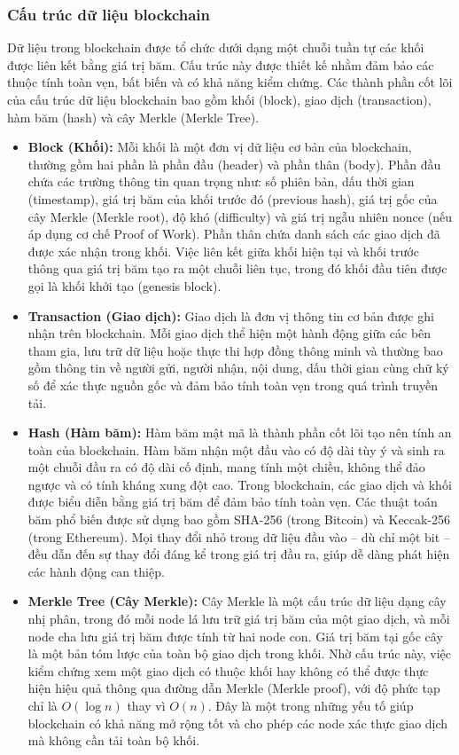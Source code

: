 \subsubsection{Cấu trúc dữ liệu blockchain}

Dữ liệu trong blockchain được tổ chức dưới dạng một chuỗi tuần tự các khối được liên kết bằng giá trị băm. Cấu trúc này được thiết kế nhằm đảm bảo các thuộc tính toàn vẹn, bất biến và có khả năng kiểm chứng. Các thành phần cốt lõi của cấu trúc dữ liệu blockchain bao gồm khối (block), giao dịch (transaction), hàm băm (hash) và cây Merkle (Merkle Tree).

\begin{itemize}
    \item \textbf{Block (Khối):} Mỗi khối là một đơn vị dữ liệu cơ bản của blockchain, thường gồm hai phần là phần đầu (header) và phần thân (body). Phần đầu chứa các trường thông tin quan trọng như: số phiên bản, dấu thời gian (timestamp), giá trị băm của khối trước đó (previous hash), giá trị gốc của cây Merkle (Merkle root), độ khó (difficulty) và giá trị ngẫu nhiên nonce (nếu áp dụng cơ chế Proof of Work). Phần thân chứa danh sách các giao dịch đã được xác nhận trong khối. Việc liên kết giữa khối hiện tại và khối trước thông qua giá trị băm tạo ra một chuỗi liên tục, trong đó khối đầu tiên được gọi là khối khởi tạo (genesis block).

    \item \textbf{Transaction (Giao dịch):} Giao dịch là đơn vị thông tin cơ bản được ghi nhận trên blockchain. Mỗi giao dịch thể hiện một hành động giữa các bên tham gia, lưu trữ dữ liệu hoặc thực thi hợp đồng thông minh và thường bao gồm thông tin về người gửi, người nhận, nội dung, dấu thời gian cùng chữ ký số để xác thực nguồn gốc và đảm bảo tính toàn vẹn trong quá trình truyền tải.

    \item \textbf{Hash (Hàm băm):} Hàm băm mật mã là thành phần cốt lõi tạo nên tính an toàn của blockchain. Hàm băm nhận một đầu vào có độ dài tùy ý và sinh ra một chuỗi đầu ra có độ dài cố định, mang tính một chiều, không thể đảo ngược và có tính kháng xung đột cao. Trong blockchain, các giao dịch và khối được biểu diễn bằng giá trị băm để đảm bảo tính toàn vẹn. Các thuật toán băm phổ biến được sử dụng bao gồm SHA-256 (trong Bitcoin) và Keccak-256 (trong Ethereum). Mọi thay đổi nhỏ trong dữ liệu đầu vào -- dù chỉ một bit -- đều dẫn đến sự thay đổi đáng kể trong giá trị đầu ra, giúp dễ dàng phát hiện các hành động can thiệp.

    \item \textbf{Merkle Tree (Cây Merkle):} Cây Merkle là một cấu trúc dữ liệu dạng cây nhị phân, trong đó mỗi node lá lưu trữ giá trị băm của một giao dịch, và mỗi node cha lưu giá trị băm được tính từ hai node con. Giá trị băm tại gốc cây là một bản tóm lược của toàn bộ giao dịch trong khối. Nhờ cấu trúc này, việc kiểm chứng xem một giao dịch có thuộc khối hay không có thể được thực hiện hiệu quả thông qua đường dẫn Merkle (Merkle proof), với độ phức tạp chỉ là $O(\log n)$ thay vì $O(n)$. Đây là một trong những yếu tố giúp blockchain có khả năng mở rộng tốt và cho phép các node xác thực giao dịch mà không cần tải toàn bộ khối.
\end{itemize}

